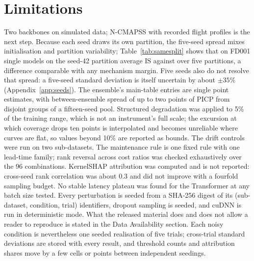 \documentclass[journal]{IEEEtran}
\newcommand{\PICP}{\mathrm{PICP}}\newcommand{\MPIW}{\mathrm{MPIW}}\newcommand{\ECE}{\mathrm{ECE}}
\newcommand{\IS}{\mathrm{IS}}\newcommand{\WIS}{\mathrm{WIS}}\newcommand{\foob}{f_{\mathrm{oob}}}
\begin{document}
\section{Limitations}
Two backbones on simulated data; N-CMAPSS \cite{chao2021} with recorded flight profiles is the next step. Because each seed draws its own partition, the five-seed spread mixes initialisation and partition variability; Table~\ref{tab:samesplit} shows that on FD001 single models on the seed-42 partition average \NOnePartSingleFDone{} $\IS$ against \NFivePartSingleFDone{} over five partitions, a difference comparable with any mechanism margin. Five seeds also do not resolve that spread: a five-seed standard deviation is itself uncertain by about $\pm35\%$ (Appendix~\ref{app:seeds}). The ensemble's main-table entries are single point estimates, with between-ensemble spread of up to two points of $\PICP$ from disjoint groups of a fifteen-seed pool. Structured degradation was applied to 5\% of the training range, which is not an instrument's full scale; the excursion at which coverage drops ten points is interpolated and becomes unreliable where curves are flat, so values beyond 10\% are reported as bounds. The drift controls were run on two sub-datasets. The maintenance rule is one fixed rule with one lead-time family; rank reversal across cost ratios was checked exhaustively over the 96 combinations. KernelSHAP attribution was computed and is not reported: cross-seed rank correlation was about 0.3 and did not improve with a fourfold sampling budget. No stable latency plateau was found for the Transformer at any batch size tested. Every perturbation is seeded from a SHA-256 digest of its (sub-dataset, condition, trial) identifiers, dropout sampling is seeded, and cuDNN is run in deterministic mode. What the released material does and does not allow a reader to reproduce is stated in the Data Availability section. Each noisy condition is nevertheless one seeded realisation of five trials; cross-trial standard deviations are stored with every result, and threshold counts and attribution shares move by a few cells or points between independent seedings.
\end{document}
